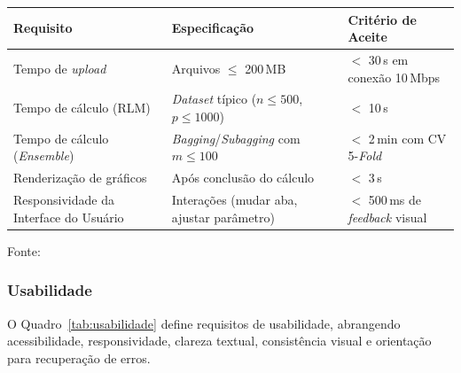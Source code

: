 \begin{quadro}[ht]
\begin{center}
\small
\captionsetup{justification=centering, labelsep=endash, width=0.75\linewidth}
\caption{Requisitos de performance do sistema.}
\label{tab:performance}
\begin{threeparttable}
\begin{tabularx}{\textwidth}{|X|X|l|} \hline
\textbf{Requisito} & \textbf{Especificação} & \textbf{Critério de Aceite} \\ \hline
Tempo de \textit{upload} & Arquivos $\leq$ 200\,MB & $<$ 30\,s em conexão 10\,Mbps \\ \hline
Tempo de cálculo (RLM) & \textit{Dataset} típico ($n \leq 500$, $p \leq 1000$) & $<$ 10\,s \\ \hline
Tempo de cálculo (\textit{Ensemble}) & \textit{Bagging}/\textit{Subagging} com $m \leq 100$ & $<$ 2\,min com CV 5-\textit{Fold} \\ \hline
Renderização de gráficos & Após conclusão do cálculo & $<$ 3\,s \\ \hline
Responsividade da Interface do Usuário & Interações (mudar aba, ajustar parâmetro) & $<$ 500\,ms de \textit{feedback} visual \\ \hline
\end{tabularx}
\begin{tablenotes}[flushleft]
\footnotesize
\item Fonte:~\oautor
\end{tablenotes}
\end{threeparttable}
\end{center}
\end{quadro}


\newpage
\subsubsection{Usabilidade}
\label{ssubsec:usabilidade}

O Quadro~\ref{tab:usabilidade} define requisitos de usabilidade, abrangendo acessibilidade, responsividade, clareza textual, consistência visual e orientação para recuperação de erros.

